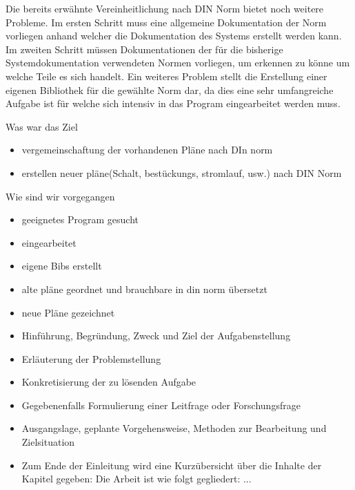   Die bereits erwähnte Vereinheitlichung nach DIN Norm bietet noch weitere Probleme. Im ersten Schritt muss eine allgemeine Dokumentation der Norm vorliegen anhand welcher die Dokumentation des Systems erstellt werden kann. Im zweiten Schritt müssen Dokumentationen der für die bisherige Systemdokumentation verwendeten Normen vorliegen, um erkennen zu könne um welche Teile es sich handelt. Ein weiteres Problem stellt die Erstellung einer eigenen Bibliothek für die gewählte Norm dar, da dies eine sehr umfangreiche Aufgabe ist für welche sich intensiv in das Program eingearbeitet werden muss.

	\item Was war das Ziel
			\begin{itemize}
		\item vergemeinschaftung der vorhandenen Pläne nach DIn norm
		\item erstellen neuer pläne(Schalt, bestückungs, stromlauf, usw.) nach DIN Norm
	\end{itemize}
	\item Wie sind wir vorgegangen
		\begin{itemize}
		\item geeignetes Program gesucht
		\item eingearbeitet
		\item eigene Bibs erstellt
		\item alte pläne geordnet und brauchbare in din norm übersetzt
		\item neue Pläne gezeichnet
	\end{itemize}


\begin{itemize}
\item Hinführung, Begründung, Zweck und Ziel der Aufgabenstellung
\item Erläuterung der Problemstellung
\item Konkretisierung der zu lösenden Aufgabe
\item Gegebenenfalls Formulierung einer Leitfrage oder Forschungsfrage
\item Ausgangslage, geplante Vorgehensweise, Methoden zur Bearbeitung und Zielsituation
\item Zum Ende der Einleitung wird eine Kurzübersicht über die Inhalte der Kapitel gegeben: \glqq Die Arbeit ist wie folgt gegliedert: ...\grqq
\end{itemize}





	
